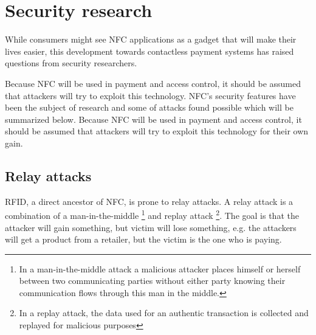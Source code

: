 \section{Security research}

While consumers might see NFC applications as a gadget that will make their lives easier, this development towards contactless payment systems has raised questions from security researchers.

Because NFC will be used in payment and access control, it should be assumed that attackers will try to exploit this technology.
NFC's security features have been the subject of research and some of attacks found possible which will be summarized below.
Because NFC will be used in payment and access control, it should be assumed that attackers will try to exploit this technology for their own gain. 


\subsection{Relay attacks}
RFID, a direct ancestor of NFC, is prone to relay attacks.
A relay attack is a combination of a man-in-the-middle \footnote{In a man-in-the-middle attack a malicious attacker places himself or herself between two communicating parties without either party knowing their communication flows through this man in the middle.} and replay attack \footnote{In a replay attack, the data used for an authentic transaction is collected and replayed for malicious purposes}.
The goal is that the attacker will gain something, but victim will lose something, e.g. the attackers will get a product from a retailer, but the victim is the one who is paying. 

